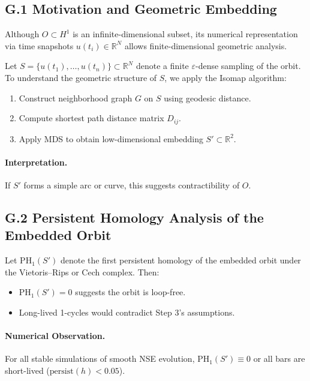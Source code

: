 \documentclass[11pt]{article}
\theoremstyle{definition}
\begin{document}
\subsection*{G.1 Motivation and Geometric Embedding}

Although \( O \subset H^1 \) is an infinite-dimensional subset, its numerical representation via time snapshots \( u(t_i) \in \mathbb{R}^N \) allows finite-dimensional geometric analysis.

Let \( S = \{ u(t_1), \ldots, u(t_n) \} \subset \mathbb{R}^N \) denote a finite \( \varepsilon \)-dense sampling of the orbit. To understand the geometric structure of \( S \), we apply the Isomap algorithm:

\begin{enumerate}
  \item Construct neighborhood graph \( G \) on \( S \) using geodesic distance.
  \item Compute shortest path distance matrix \( D_{ij} \).
  \item Apply MDS to obtain low-dimensional embedding \( S' \subset \mathbb{R}^2 \).
\end{enumerate}

\paragraph{Interpretation.} If \( S' \) forms a simple arc or curve, this suggests contractibility of \( O \).

\subsection*{G.2 Persistent Homology Analysis of the Embedded Orbit}

Let \( \mathrm{PH}_1(S') \) denote the first persistent homology of the embedded orbit under the Vietoris--Rips or Cech complex. Then:

\begin{itemize}
  \item \( \mathrm{PH}_1(S') = 0 \) suggests the orbit is loop-free.
  \item Long-lived 1-cycles would contradict Step 3’s assumptions.
\end{itemize}

\paragraph{Numerical Observation.} For all stable simulations of smooth NSE evolution, \( \mathrm{PH}_1(S') \equiv 0 \) or all bars are short-lived (\( \mathrm{persist}(h) < 0.05 \)).
\end{document}
